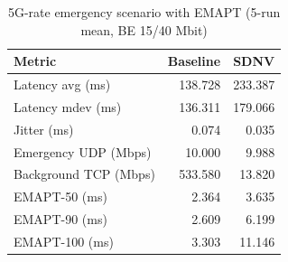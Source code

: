 \begin{table}[t]
\caption{5G-rate emergency scenario with EMAPT (5-run mean, BE 15/40 Mbit)}
\label{tab:5g-emergency-emapt-be1540}
\centering
\begin{tabular}{lrr}
\hline
Metric & Baseline & SDNV \\
\hline
Latency avg (ms) & 138.728 & 233.387 \\
Latency mdev (ms) & 136.311 & 179.066 \\
Jitter (ms) & 0.074 & 0.035 \\
Emergency UDP (Mbps) & 10.000 & 9.988 \\
Background TCP (Mbps) & 533.580 & 13.820 \\
EMAPT-50 (ms) & 2.364 & 3.635 \\
EMAPT-90 (ms) & 2.609 & 6.199 \\
EMAPT-100 (ms) & 3.303 & 11.146 \\
\hline
\end{tabular}
\end{table}
